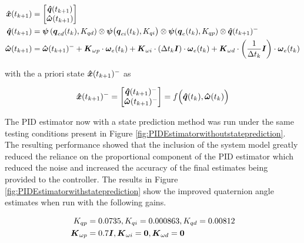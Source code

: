 \begin{subequations}
  \begin{align}
    \boldsymbol{\hat{x}}(t_{k+1}) &= \begin{bmatrix} \boldsymbol{\hat{q}}(t_{k+1}) \\ \boldsymbol{\hat{\omega}}(t_{k+1}) \end{bmatrix} \\
    \boldsymbol{\hat{q}}(t_{k+1}) &= \boldsymbol{\psi}\left(\boldsymbol{q}_{ed}(t_k), K_{qd}\right) \otimes \boldsymbol{\psi}\big(\boldsymbol{q}_{ei}(t_k), K_{qi}\big) \otimes \boldsymbol{\psi}(\boldsymbol{q}_e(t_{k}), K_{qp})  \otimes \boldsymbol{\hat{q}}(t_{k+1})^- \\
    \boldsymbol{\hat{\omega}}(t_{k+1}) &= \boldsymbol{\hat{\omega}}(t_{k+1})^- + \boldsymbol{K}_{\omega p} \cdot \boldsymbol{\omega}_e(t_{k}) + \boldsymbol{K}_{\omega i} \cdot (\Delta t_k \boldsymbol{I})\cdot \boldsymbol{\omega}_e(t_{k}) + \boldsymbol{K}_{\omega d} \cdot \left(\frac{1}{\Delta t_k} \boldsymbol{I}\right) \cdot \boldsymbol{\omega}_e(t_{k})
  \end{align}
  \label{eqn:PIDEstimatorwithPredictionUnforcedMotion}
\end{subequations}

with the a priori state $\boldsymbol{\hat{x}}(t_{k+1})^-$ as

\begin{equation}
  \boldsymbol{\hat{x}}(t_{k+1})^- = \begin{bmatrix}\boldsymbol{\hat{q}}(t_{k+1})^- \\ \boldsymbol{\hat{\omega}}(t_{k+1})^- \end{bmatrix} = f \Big( \boldsymbol{\hat{q}}(t_{k}), \boldsymbol{\hat{\omega}}(t_{k}) \Big)
\end{equation}

The PID estimator now with a state prediction method was run under the same testing conditions present in Figure \ref{fig:PIDEstimatorwithoutstateprediction}.  The resulting performance showed that the inclusion of the system model greatly reduced the reliance on the proportional component of the PID estimator which reduced the noise and increased the accuracy of the final estimates being provided to the controller.  The results in Figure \ref{fig:PIDEstimatorwithstateprediction} show the improved quaternion angle estimates when run with the following gains.

\begin{equation}
  \begin{aligned}
    K_{qp} &= 0.0735, K_{qi} = 0.000863, K_{qd} = 0.00812 \\
    \boldsymbol{K}_{\omega p} &= 0.7 \boldsymbol{I}, \boldsymbol{K}_{\omega i} = \boldsymbol{0}, \boldsymbol{K}_{\omega d} = \boldsymbol{0}
  \end{aligned}
\end{equation}

